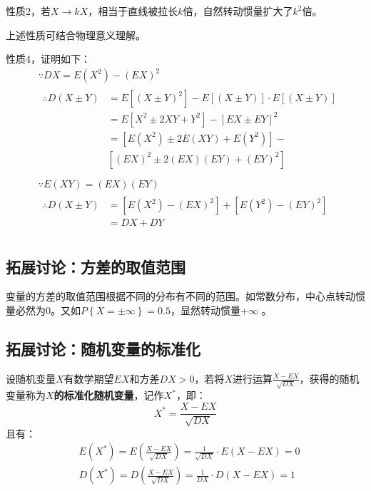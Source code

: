 性质2，若$X\rightarrow kX$，相当于直线被拉长$k$倍，自然转动惯量扩大了$k^2$倍。

\begin{tcolorbox}
上述性质可结合物理意义理解。
\end{tcolorbox}

性质4，证明如下：
\begin{align*}
&\because DX=E\left( X^2 \right) -\left( EX \right) ^2 \\
&\begin{aligned}
	\therefore D\left( X\pm Y \right) &=E\left[ \left( X\pm Y \right) ^2 \right] -E\left[ \left( X\pm Y \right) \right] \cdot E\left[ \left( X\pm Y \right) \right]\\
	&=E\left[ X^2\pm 2XY+Y^2 \right] -\left[ EX\pm EY \right] ^2\\
	&=\left[ E\left( X^2 \right) \pm 2E\left( XY \right) +E\left( Y^2 \right) \right] -\\
	&\left[ \left( EX \right) ^2\pm 2\left( EX \right) \left( EY \right) +\left( EY \right) ^2 \right]\\
\end{aligned} \\
&\because E\left( XY \right) =\left( EX \right) \left( EY \right) \\
&\begin{aligned}
	\therefore D\left( X\pm Y \right) &=\left[ E\left( X^2 \right) -\left( EX \right) ^2 \right] +\left[ E\left( Y^2 \right) -\left( EY \right) ^2 \right]\\
	&=DX+DY\\
\end{aligned}
\end{align*}

\subsection{拓展讨论：方差的取值范围}

变量的方差的取值范围根据不同的分布有不同的范围。如常数分布，中心点转动惯量必然为0。又如$P\left\{ X=\pm \infty \right\} =0.5$，显然转动惯量$+\infty $ 。

\subsection{拓展讨论：随机变量的标准化}

\begin{definition}[随机变量的标准化]
设随机变量$X$有数学期望$EX$和方差$DX>0$，若将$X$进行运算$\frac{X-EX}{\sqrt{DX}}$，获得的随机变量称为{\bf $X$的标准化随机变量}，记作$X^*$，即：
\[
X^*=\frac{X-EX}{\sqrt{DX}}
\]
且有：
\begin{align*}
&E\left( X^* \right) =E\left( \frac{X-EX}{\sqrt{DX}} \right) =\frac{1}{\sqrt{DX}}\cdot E\left( X-EX \right) =0 \\
&D\left( X^* \right) =D\left( \frac{X-EX}{\sqrt{DX}} \right) =\frac{1}{DX}\cdot D\left( X-EX \right) =1
\end{align*}
\end{definition}

